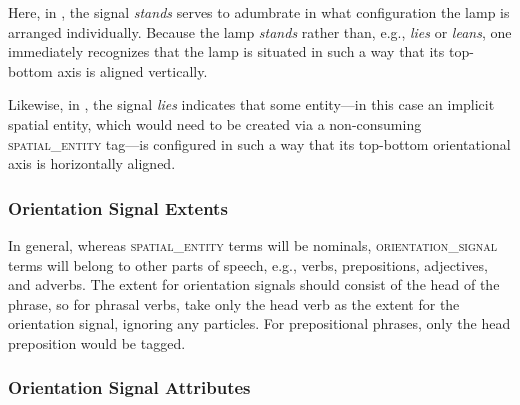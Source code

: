 \documentclass[11pt]{article}
\begin{document}
Here, in , the signal \emph{stands} serves to adumbrate in what configuration the lamp is arranged individually. Because the lamp \emph{stands} rather than, e.g., \emph{lies} or \emph{leans}, one immediately recognizes that the lamp is situated in such a way that its top-bottom axis is aligned vertically.

Likewise, in , the signal \emph{lies} indicates that some entity---in this case an implicit spatial entity, which would need to be created via a non-consuming \textsc{spatial\_entity} tag---is configured in such a way that its top-bottom orientational axis is horizontally aligned. 

\subsubsection{Orientation Signal Extents} %
\label{ssub:orientation_signal_extents}
In general, whereas \textsc{spatial\_entity} terms will be nominals, \textsc{orientation\_signal} terms will belong to other parts of speech, e.g., verbs, prepositions, adjectives, and adverbs. The extent for orientation signals should consist of the head of the phrase, so for phrasal verbs, take only the head verb as the extent for the orientation signal, ignoring any particles. For prepositional phrases, only the head preposition would be tagged.


\subsubsection{Orientation Signal Attributes} %
\label{ssub:orientation_signal_attributes}
\end{document}
